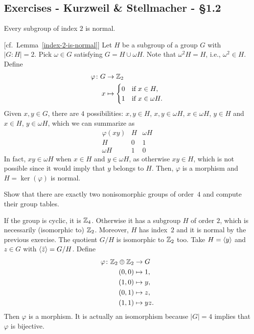 \subsection{Exercises - Kurzweil \& Stellmacher - \S 1.2}

\begin{exr}\label{exr:index-2-is-normal}
    Every subgroup of index\/ $2$ is normal.
\end{exr}

\begin{solution} {[cf.~Lemma~\ref{index-2-is-normal}]} Let $H$ be a subgroup of a group $G$ with $|G:H|=2$. Pick $\omega\in G$ satisfying $G=H\cup \omega H$. Note that $\omega^2H=H$, i.e., $\omega^2\in H$. Define
\begin{align*}
    \varphi\colon G&\to\mathbb{Z}_2\\
    x &\mapsto  \begin{cases}
        0   &\textrm{if }x\in H,\\
        1   &\textrm{if }x\in\omega H.
    \end{cases}
\end{align*}
Given $x,y\in G$, there are $4$ possibilities: $x,y\in H$, $x,y\in\omega H$, $x\in\omega H$, $y\in H$ and $x\in H$, $y\in\omega H$, which we can summarize as
$$
    \begin{array}{c|cc}
        \varphi(xy) & H & \omega H \\
        \hline
        H & 0 & 1 \\
        \omega H & 1 & 0
    \end{array}
$$
In fact, $xy\in\omega H$ when $x\in H$ and $y\in\omega H$, as otherwise $xy\in H$, which is not possible since it would imply that $y$ belongs to $H$. Then, $\varphi$ is a morphism and $H=\ker(\varphi)$ is normal.  \end{solution}

\begin{exr}
    Show that there are exactly two nonisomorphic groups of order\/~$4$ and compute their group tables.
\end{exr}

\begin{solution} If the group is cyclic, it is $\mathbb{Z}_4$. Otherwise it has a subgroup $H$ of order $2$, which is necessarily (isomorphic to) $\mathbb{Z}_2$. Moreover, $H$ has index~$2$ and it is normal by the previous exercise. The quotient $G/H$ is isomorphic to $\mathbb{Z}_2$ too. Take $H=\langle y\rangle$ and $z\in G$ with $\langle\bar z\rangle=G/H$. Define
\begin{align*}
    \varphi\colon\mathbb{Z}_2\oplus\mathbb{Z}_2&\to G\\
    (0,0)&\mapsto 1,\\
    (1,0)&\mapsto y,\\
    (0,1)&\mapsto z,\\
    (1,1)&\mapsto yz.
\end{align*}
Then $\varphi$ is a morphism. It is actually an isomorphism because $|G|=4$ implies that $\varphi$ is bijective.  \end{solution}

